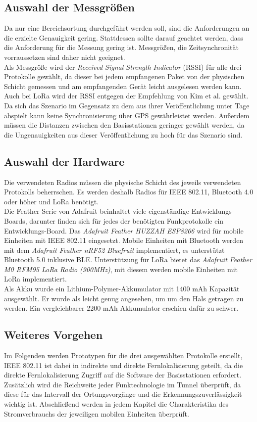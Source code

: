 \subsection{Auswahl der Messgrößen}
Da nur eine Bereichsortung durchgeführt werden soll, sind die Anforderungen an die erzielte Genauigkeit gering.
Stattdessen sollte darauf geachtet werden, dass die Anforderung für die Messung gering ist.
Messgrößen, die Zeitsynchronität vorraussetzen sind daher nicht geeignet.\\
Als Messgröße wird der \emph{Received Signal Strength Indicator} (RSSI) für alle drei Protokolle gewählt, da dieser bei jedem empfangenen Paket von der physischen Schicht gemessen und am empfangenden Gerät leicht ausgelesen werden kann.\\
Auch bei LoRa wird der RSSI entgegen der Empfehlung von Kim et al. gewählt.
Da sich das Szenario im Gegensatz zu dem aus ihrer  Veröffentlichung unter Tage abspielt kann keine Synchronisierung über GPS gewährleistet werden. 
Außerdem müssen die Distanzen zwischen den Basisstationen geringer gewählt werden, da die Ungenauigkeiten aus dieser Veröffentlichung zu hoch für das Szenario sind.

\subsection{Auswahl der Hardware}
Die verwendeten Radios müssen die physische Schicht des jeweils verwendeten Protokolls beherrschen.
Es werden deshalb Radios für IEEE 802.11, Bluetooth 4.0 oder höher und LoRa benötigt.\\
Die Feather-Serie von Adafruit beinhaltet viele eigenständige Entwicklungs-Boards, darunter finden sich für jedes der benötigten Funkprotokolle ein Entwicklungs-Board.
Das \textit{Adafruit Feather HUZZAH ESP8266} wird für mobile Einheiten mit IEEE 802.11 eingesetzt.
Mobile Einheiten mit Bluetooth werden mit dem \textit{Adafruit Feather nRF52 Bluefruit} implementiert, es unterstützt Bluetooth 5.0 inklusive BLE.
Unterstützung für LoRa bietet das \textit{Adafruit Feather M0 RFM95 LoRa Radio (900MHz)}, mit diesem werden mobile Einheiten mit LoRa implementiert.\\
Als Akku wurde ein Lithium-Polymer-Akkumulator mit 1400 mAh Kapazität ausgewählt.
Er wurde als leicht genug angesehen, um um den Hals getragen zu werden. 
Ein vergleichbarer 2200 mAh Akkumulator erschien dafür zu schwer.


\subsection{Weiteres Vorgehen}
Im Folgenden werden Prototypen für die drei ausgewählten Protokolle erstellt, IEEE 802.11 ist dabei in indirekte und direkte Fernlokalisierung geteilt, da die direkte Fernlokalisierung Zugriff auf die Software der Basisstationen erfordert.
Zusätzlich wird die Reichweite jeder Funktechnologie im Tunnel überprüft, da diese für das Intervall der Ortungsvorgänge und die Erkennungszuverlässigkeit wichtig ist.
Abschließend werden in jedem Kapitel die Charakteristika des Stromverbrauchs der jeweiligen mobilen Einheiten überprüft.
